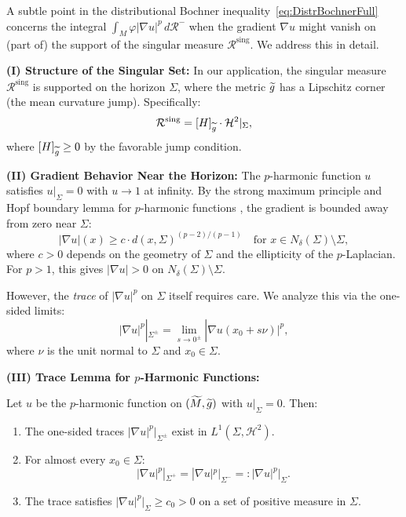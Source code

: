 \begin{remark}\label{rem:SingCurvGradInteraction}
A subtle point in the distributional Bochner inequality~\eqref{eq:DistrBochnerFull} concerns the integral $\int_M \varphi |\nabla u|^p \, d\mathcal{R}^-$ when the gradient $\nabla u$ might vanish on (part of) the support of the singular measure $\mathcal{R}^{\text{sing}}$. We address this in detail.

\textbf{(I) Structure of the Singular Set:}
In our application, the singular measure $\mathcal{R}^{\text{sing}}$ is supported on the horizon $\Sigma$, where the metric $\widetilde{g}$ has a Lipschitz corner (the mean curvature jump). Specifically:
\begin{equation}
    \mathcal{R}^{\text{sing}} = [H]_{\widetilde{g}} \cdot \mathcal{H}^2|_\Sigma,
\end{equation}
where $[H]_{\widetilde{g}} \ge 0$ by the favorable jump condition.

\textbf{(II) Gradient Behavior Near the Horizon:}
The $p$-harmonic function $u$ satisfies $u|_\Sigma = 0$ with $u \to 1$ at infinity. By the strong maximum principle and Hopf boundary lemma for $p$-harmonic functions \cite{tolksdorf1984, lieberman1988}, the gradient is bounded away from zero near $\Sigma$:
\begin{equation}
    |\nabla u|(x) \ge c \cdot d(x, \Sigma)^{(p-2)/(p-1)} \quad \text{for } x \in N_\delta(\Sigma) \setminus \Sigma,
\end{equation}
where $c > 0$ depends on the geometry of $\Sigma$ and the ellipticity of the $p$-Laplacian. For $p > 1$, this gives $|\nabla u| > 0$ on $N_\delta(\Sigma) \setminus \Sigma$.

However, the \emph{trace} of $|\nabla u|^p$ on $\Sigma$ itself requires care. We analyze this via the one-sided limits:
\begin{equation}
    |\nabla u|^p|_{\Sigma^\pm} = \lim_{s \to 0^\pm} |\nabla u(x_0 + s\nu)|^p,
\end{equation}
where $\nu$ is the unit normal to $\Sigma$ and $x_0 \in \Sigma$.

\textbf{(III) Trace Lemma for $p$-Harmonic Functions:}
\begin{lemma}\label{lem:GradientTrace}
Let $u$ be the $p$-harmonic function on $(\widetilde{M}, \widetilde{g})$ with $u|_\Sigma = 0$. Then:
\begin{enumerate}
    \item[(a)] The one-sided traces $|\nabla u|^p|_{\Sigma^\pm}$ exist in $L^1(\Sigma, \mathcal{H}^2)$.
    \item[(b)] For almost every $x_0 \in \Sigma$:
    \begin{equation}
        |\nabla u|^p|_{\Sigma^+} = |\nabla u|^p|_{\Sigma^-} =: |\nabla u|^p|_\Sigma.
    \end{equation}
    \item[(c)] The trace satisfies $|\nabla u|^p|_\Sigma \ge c_0 > 0$ on a set of positive measure in $\Sigma$.
\end{enumerate}
\end{lemma}


\end{remark}
